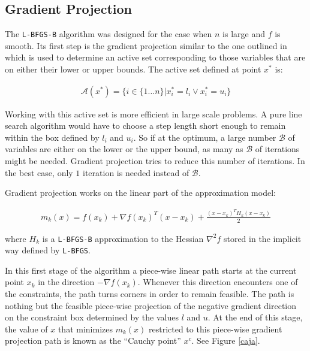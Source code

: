 \subsection{Gradient Projection} \label{gp}
The \texttt{L-BFGS-B} algorithm was designed for the case when $n$ is large and $f$ is smooth. Its first step is the gradient projection similar to the one outlined in \citep{gradproj1, gradproj2} which is used to determine an active set corresponding to those variables that are on either their lower or upper bounds. The active set defined at point $x^*$ is:

\begin{equation}
  \begin{aligned}
    \mathcal{A}(x^*) = \{ i \in \{1 \ldots n\} |  x^*_i = l_i \vee  x^*_i = u_i\}
  \end{aligned}
\end{equation}

Working with this active set is more efficient in large scale problems. A pure line search algorithm would have to choose a step length short enough to remain within the box defined by $l_i$ and $u_i$. So if at the optimum, a large number $\mathcal{B}$ of variables are either on the lower or the upper bound, as many as $\mathcal{B}$ of iterations might be needed. Gradient projection tries to reduce this number of iterations. In the best case, only $1$ iteration is needed instead of $\mathcal{B}$.

Gradient projection works on the linear part of the approximation model:

\begin{equation} \label{themodel}
  \begin{aligned}
    m_k(x) = f(x_k) + \nabla f(x_k)^T ( x - x_k) + \frac{(x - x_k)^T H_k (x - x_k) }{2}
  \end{aligned}
\end{equation}

where $H_k$ is a \texttt{L-BFGS-B} approximation to the Hessian $\nabla^2 f$ stored in the implicit way defined by \texttt{L-BFGS}.

In this first stage of the algorithm a piece-wise linear path starts at the current point $x_k$ in the direction $-\nabla f(x_k)$. Whenever this direction encounters one of the constraints, the path turns corners in order to remain feasible. The path is nothing but the feasible piece-wise projection of the negative gradient direction on the constraint box determined by the values $l$ and $u$. At the end of this stage, the value of $x$ that minimizes $m_k(x)$ restricted to this piece-wise gradient projection path is known as the ``Cauchy point'' $x^c$. See Figure \ref{caja}.

